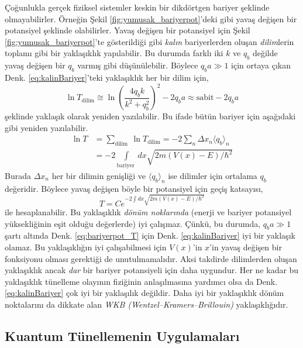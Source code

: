 \documentclass[a4paper,12pt, twoside]{article}
\begin{document}
Çoğunlukla gerçek fiziksel sistemler keskin bir dikdörtgen bariyer şeklinde olmayabilirler. Örneğin Şekil \ref{fig:yumusak_bariyerpot}'deki gibi yavaş değişen bir potansiyel şeklinde olabilirler. Yavaş değişen bir potansiyel için Şekil \ref{fig:yumusak_bariyerpot}'te gösterildiği gibi \emph{kalın} bariyerlerden oluşan \emph{dilim}lerin toplamı gibi bir yaklaşıklık yapılabilir. Bu durumda farklı iki $k$ ve $q_b$ değilde yavaş değişen bir $q_b$ varmış gibi düşünülebilir. Böylece $q_b a \gg 1$ için ortaya çıkan Denk. \ref{eq:kalinBariyer}'teki yaklaşıklık her bir dilim için,
\begin{equation}
\ln T_\text{dilim} \cong \ln \left(\frac{4 q_b k}{k^{2}+ q_b^{2}}\right)^{2}-2 q_b a \approx \mathrm{sabit}-2 q_b a
\end{equation}
şeklinde yaklaşık olarak yeniden yazılabilir. Bu ifade bütün bariyer için aşağıdaki gibi yeniden yazılabilir.
\begin{align} 
\ln T &=\sum_{\text {dilim }} \ln T_{\text{dilim}}=-2 \sum_{n} \Delta x_{n}\langle q_b\rangle_{n} \nonumber\\ 
&=-2 \int\limits_{\text {bariyer }} dx\sqrt{2 m(V(x)-E) / \hbar^{2}} 
\end{align}
Burada $\Delta x_{n}$ her bir dilimin genişliği ve $\langle q_b\rangle_{n}$ ise dilimler için ortalama $q_b$ değeridir. Böylece yavaş değişen böyle bir potansiyel için geçiş katsayısı,
\begin{equation}
T=C e^{-2 \int d x \sqrt{2 m(V(x)-E) / \hbar^{2}}}
\end{equation}
ile hesaplanabilir. Bu yaklaşıklık \emph{dönüm noklarında} (enerji ve bariyer potansiyel yüksekliğinin eşit olduğu değerlerde) iyi çalışmaz. Çünkü, bu durumda, $q_b a \gg 1$ şartı altında Denk. \ref{eq:bariyerpot_T} için Denk. \ref{eq:kalinBariyer} iyi bir yaklaşık olamaz.
Bu yaklaşıklığın iyi çalışabilmesi için $V(x)$'in $x$'in yavaş değişen bir fonksiyonu olması gerektiği de unutulmamalıdır. Aksi takdirde dilimlerden oluşan yaklaşıklık ancak \emph{dar} bir bariyer potansiyeli için daha uygundur. Her ne kadar bu yaklaşıklık tünelleme olayının fiziğinin anlaşılmasına yardımcı olsa da Denk. \ref{eq:kalinBariyer} çok iyi bir yaklaşılık değildir. Daha iyi bir yaklaşıklık dönüm noktalarını da dikkate alan \emph{WKB (Wentzel–Kramers–Brillouin)} yaklaşıklığıdır.

\subsection{Kuantum Tünellemenin Uygulamaları}
\end{document}
